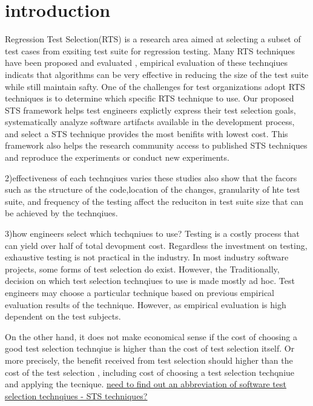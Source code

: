 \chapter{introduction}\label{chap:intro}


Regression Test Selection(RTS) is a research area aimed at selecting a subset
of test cases from exsiting test suite for regression testing. Many RTS
techniques have been proposed and evaluated , %
empirical evaluation of these technqiues indicats that algorithms can be very
effective in reducing the size of the test suite while still maintain
safty\cite{}. One of the challenges for test organizations adopt RTS techniques
is to determine which specific RTS technique to use. Our proposed STS framework helps test engineers explictly express their test selection goals, systematically analyze software artifacts available in the development process, and select a STS technique provides the most benifits with lowest cost. This framework also helps the research community access to published STS techniques and reproduce the experiments or
conduct new experiments.




2)effectiveness of each technqiues varies
 these studies also show that the facors such as the structure of the
 code,location of the changes, granularity of hte test suite, and frequency of
 the testing affect the reduciton in test suite size that can be achieved by the
 technqiues.

3)how engineers select which techqniues to use? 
Testing is a costly process that can yield over half of total
devopment cost. Regardless the investment on testing, exhaustive testing is not
practical in the industry. In most industry software projects, some forms of
test selection do exist. However, the  Traditionally, decision on which test
selection technqiues to use is made mostly ad hoc. Test engineers may choose a
particular technique based on previous empirical evaluation results of the
technique. However, as empirical evaluation is high dependent on the test
subjects. \cite{DBLP:conf/esem/KasurinenTS10}


On the other hand, it does not make economical sense if the cost of choosing a
good test selection technqiue is higher than the cost of test selection itself.
Or more precisely, the benefit received from test selection should higher
than the cost of the test selection , including cost of choosing a
test selection techqniue and applying the tecnique.
\underline{need to find out an abbreviation of software test selection
technqiues - STS techniques?}


